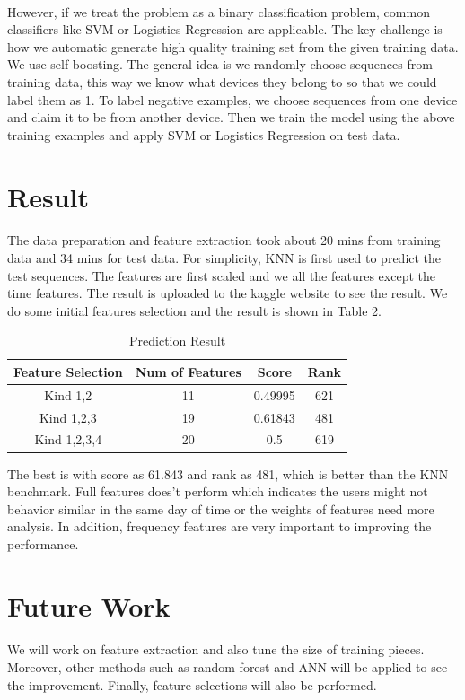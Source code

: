 \documentclass{article}
\begin{document}
		\paragraph{} However, if we treat the problem as a binary classification problem, common classifiers like SVM or Logistics Regression are applicable. The key challenge is how we automatic generate high quality training set from the given training data. We use self-boosting. The general idea is we randomly choose sequences from training data, this way we know what devices they belong to so that we could label them as 1. To label negative examples, we choose sequences from one device and claim it to be from another device. Then we train the model using the above training examples and apply SVM or Logistics Regression on test data.
	
	\section{Result} %
	\label{sec:result}
	\paragraph{} The data preparation and feature extraction took about 20 mins from training data and 34 mins for test data. For simplicity, KNN is first used to predict the test sequences. The features are first scaled and we all the features except the time features. The result is uploaded to the kaggle website to see the result. We do some initial features selection and the result is shown in Table 2. 
	\begin{table}
		\centering
		\caption{Prediction Result}
		\begin{tabular}{c|c|c|c}
			Feature Selection & Num of Features & Score & Rank \\ \hline
			Kind 1,2 & 11 & 0.49995 & 621 \\ 
			Kind 1,2,3 & 19 & 0.61843 & 481 \\ 
			Kind 1,2,3,4 & 20 & 0.5 & 619 \\
		\end{tabular}
	\end{table}
	The best is with score as 61.843 and rank as 481, which is better than the KNN benchmark. Full features does't perform which indicates the users might not behavior similar in the same day of time or the weights of features need more analysis. In addition, frequency features are very important to improving the performance. 
	
	
	
	\section{Future Work} %
	\label{sec:future_work}
	\paragraph{} We will work on feature extraction and also tune the size of training pieces. Moreover, other methods such as random forest and ANN will be applied to see the improvement. Finally, feature selections will also be performed. 
	
\end{document}
